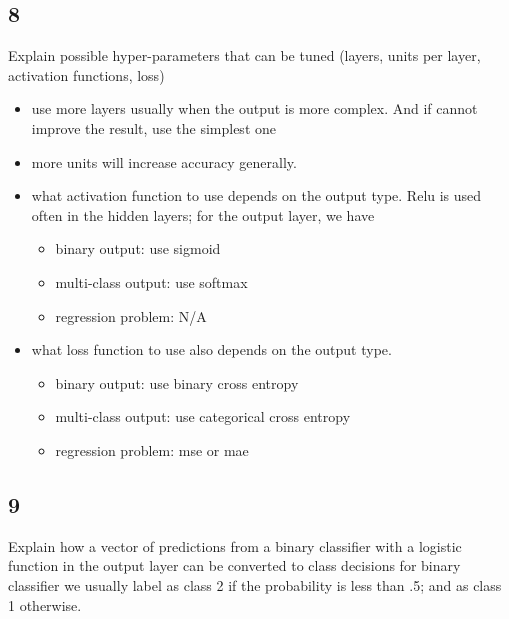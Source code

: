 \documentclass{article}
\begin{document}
\subsection*{8}
\begin{myleftlinebox}
    Explain possible hyper-parameters that can be tuned (layers, units per layer, activation functions, loss)
    \tcblower
    \begin{itemize}
        \item use more layers usually when the output is more complex. And if cannot improve the result, use the simplest one
        \item more units will increase accuracy generally.
        \item what activation function to use depends on the output type. Relu is used often in the hidden layers; for the output layer, we have
        \begin{itemize}
            \item binary output: use sigmoid
            \item multi-class output: use softmax
            \item regression problem: N/A
        \end{itemize}
        \item what loss function to use also depends on the output type. 
        \begin{itemize}
            \item binary output: use binary cross entropy
            \item multi-class output: use categorical cross entropy
            \item regression problem: mse or mae
        \end{itemize}
    \end{itemize}
\end{myleftlinebox}

\subsection*{9}
\begin{myleftlinebox}
    Explain how a vector of predictions from a binary classifier with a logistic function in the output layer can be converted to class decisions
    \tcblower
    for binary classifier we usually label as class 2 if the probability is less than .5; and as class 1 otherwise.
\end{myleftlinebox}
\end{document}
